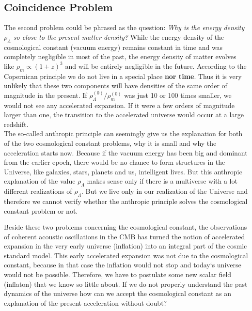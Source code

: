 \subsection{Coincidence Problem}
The second problem  could be phrased as the question: \textit{Why is the energy density $\rho_\Lambda$ so close to the present matter density?} While the energy density of the cosmological constant (vacuum energy) remains constant in time and was completely negligible in most of the past, the energy density of matter evolves like $\rho_m\propto(1+z)^3$ and will be entirely negligible in the future. According to the Copernican principle \parencite{ellis_maartens_maccallum_2012} we do not live in a special place \textbf{nor time}. Thus it is very unlikely that these two components will have densities of the same order of magnitude in the present. If $\rho^{(0)}_\Lambda/\rho^{(0)}_m$ was just 10 or 100 times smaller, we would not see any accelerated expansion. If it were a few orders of magnitude larger than one, the transition to the accelerated universe would occur at a large redshift.
\\

The so-called anthropic principle can seemingly give us the explanation for both of the two cosmological constant problems, why it is small and why the acceleration starts now. Because if the vacuum energy has been big and dominant from the earlier epoch, there would be no chance to form structures in the Universe, like galaxies, stars, planets and us, intelligent lives. But this anthropic explanation of the value $\rho_\Lambda$ makes sense only if there is a multiverse with a lot different realizations of $\rho_\Lambda$. But we live only in our realization of the Universe and therefore we cannot verify whether the anthropic principle solves the cosmological constant problem or not.

Beside these two problems concerning the cosmological constant, the observations of coherent acoustic oscillations in the CMB \parencite{planck_cosm} has turned the notion of accelerated expansion in the very early universe (inflation) into an integral part of the cosmic standard model. This early accelerated expansion was not due to the cosmological constant, because in that case the inflation would not stop and today`s universe would not be possible. Therefore, we have to postulate some new scalar field (inflaton) \parencite{2015IJMPD..2430010C} that we know so little about. If we do not properly understand the past dynamics of the universe how can we accept the cosmological constant as an explanation of the present acceleration without doubt?
